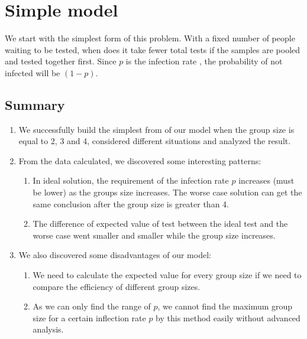 \section{Simple model}
We start with the simplest form of this problem. With a fixed number of people waiting to be tested, when does it take fewer total tests if the samples are pooled and tested together first. Since $p$ is the infection rate , the probability of not infected will be $(1-p)$.









\subsection{Summary}
\begin{enumerate}
  \item We successfully build the simplest from of our model when the group size is equal to 2, 3 and 4, considered different situations and analyzed the result.
  \item From the data calculated, we discovered some interesting patterns:
  \begin{enumerate}
     \item In ideal solution, the requirement of the infection rate $p$ increases (must be lower) as the groups size increases. The worse case solution can get the same conclusion after the group size is greater than 4.
     \item The difference of expected value of test between the ideal test and the worse case went smaller and smaller while the group size increases.
    \end{enumerate}
  \item We also discovered some disadvantages of our model: 
  \begin{enumerate}
     \item We need to calculate the expected value for every group size if we need to compare the efficiency of different group sizes.
     \item As we can only find the range of $p$, we cannot find the maximum group size for a certain inflection rate $p$ by this method easily without advanced analysis.
    \end{enumerate}
\end{enumerate}